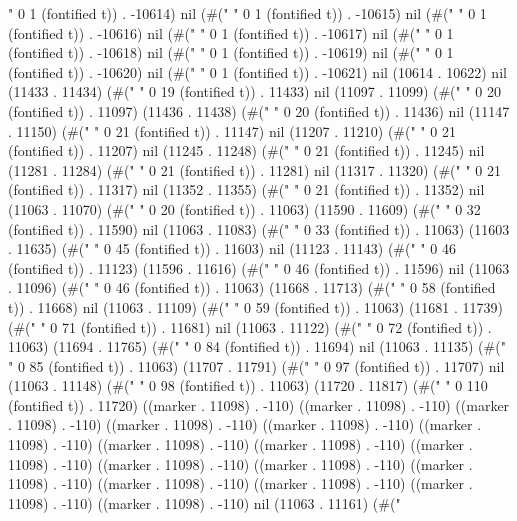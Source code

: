 {" 0 1 (fontified t)) . -10614) nil (#(" " 0 1 (fontified t)) . -10615) nil (#(" " 0 1 (fontified t)) . -10616) nil (#(" " 0 1 (fontified t)) . -10617) nil (#(" " 0 1 (fontified t)) . -10618) nil (#(" " 0 1 (fontified t)) . -10619) nil (#(" " 0 1 (fontified t)) . -10620) nil (#(" " 0 1 (fontified t)) . -10621) nil (10614 . 10622) nil (11433 . 11434) (#("                   " 0 19 (fontified t)) . 11433) nil (11097 . 11099) (#("                    " 0 20 (fontified t)) . 11097) (11436 . 11438) (#("                    " 0 20 (fontified t)) . 11436) nil (11147 . 11150) (#("                     " 0 21 (fontified t)) . 11147) nil (11207 . 11210) (#("                     " 0 21 (fontified t)) . 11207) nil (11245 . 11248) (#("                     " 0 21 (fontified t)) . 11245) nil (11281 . 11284) (#("                     " 0 21 (fontified t)) . 11281) nil (11317 . 11320) (#("                     " 0 21 (fontified t)) . 11317) nil (11352 . 11355) (#("                     " 0 21 (fontified t)) . 11352) nil (11063 . 11070) (#("                    " 0 20 (fontified t)) . 11063) (11590 . 11609) (#("                                " 0 32 (fontified t)) . 11590) nil (11063 . 11083) (#("                                 " 0 33 (fontified t)) . 11063) (11603 . 11635) (#("                                             " 0 45 (fontified t)) . 11603) nil (11123 . 11143) (#("                                              " 0 46 (fontified t)) . 11123) (11596 . 11616) (#("                                              " 0 46 (fontified t)) . 11596) nil (11063 . 11096) (#("                                              " 0 46 (fontified t)) . 11063) (11668 . 11713) (#("                                                          " 0 58 (fontified t)) . 11668) nil (11063 . 11109) (#("                                                           " 0 59 (fontified t)) . 11063) (11681 . 11739) (#("                                                                       " 0 71 (fontified t)) . 11681) nil (11063 . 11122) (#("                                                                        " 0 72 (fontified t)) . 11063) (11694 . 11765) (#("                                                                                    " 0 84 (fontified t)) . 11694) nil (11063 . 11135) (#("                                                                                     " 0 85 (fontified t)) . 11063) (11707 . 11791) (#("                                                                                                 " 0 97 (fontified t)) . 11707) nil (11063 . 11148) (#("                                                                                                  " 0 98 (fontified t)) . 11063) (11720 . 11817) (#("                                                                                                              " 0 110 (fontified t)) . 11720) ((marker . 11098) . -110) ((marker . 11098) . -110) ((marker . 11098) . -110) ((marker . 11098) . -110) ((marker . 11098) . -110) ((marker . 11098) . -110) ((marker . 11098) . -110) ((marker . 11098) . -110) ((marker . 11098) . -110) ((marker . 11098) . -110) ((marker . 11098) . -110) ((marker . 11098) . -110) ((marker . 11098) . -110) ((marker . 11098) . -110) ((marker . 11098) . -110) ((marker . 11098) . -110) nil (11063 . 11161) (#("                                     }
